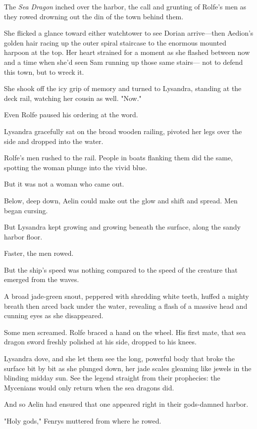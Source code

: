 The \emph{Sea Dragon} inched over the harbor, the call and grunting of Rolfe's men as they rowed drowning out the din of the town behind them.

She flicked a glance toward either watchtower to see Dorian arrive---then Aedion's golden hair racing up the outer spiral staircase to the enormous mounted harpoon at the top. Her heart strained for a moment as she flashed between now and a time when she'd seen Sam running up those same stairs--- not to defend this town, but to wreck it.

She shook off the icy grip of memory and turned to Lysandra, standing at the deck rail, watching her cousin as well. "Now."

Even Rolfe paused his ordering at the word.

Lysandra gracefully sat on the broad wooden railing, pivoted her legs over the side  and dropped into the water.

Rolfe's men rushed to the rail. People in boats flanking them did the same, spotting the woman plunge into the vivid blue.

But it was not a woman who came out.

Below, deep down, Aelin could make out the glow and shift and spread. Men began cursing.

But Lysandra kept growing and growing beneath the surface, along the sandy harbor floor.

Faster, the men rowed.

But the ship's speed was nothing compared to the speed of the creature that emerged from the waves.

A broad jade-green snout, peppered with shredding white teeth, huffed a mighty breath then arced back under the water, revealing a flash of a massive head and cunning eyes as she disappeared.

Some men screamed. Rolfe braced a hand on the wheel. His first mate, that sea dragon sword freshly polished at his side, dropped to his knees.

Lysandra dove, and she let them see the long, powerful body that broke the surface bit by bit as she plunged down, her jade scales gleaming like jewels in the blinding midday sun. See the legend straight from their prophecies: the Mycenians would only return when the sea dragons did.

And so Aelin had ensured that one appeared right in their gods-damned harbor.

"Holy gods," Fenrys muttered from where he rowed.

